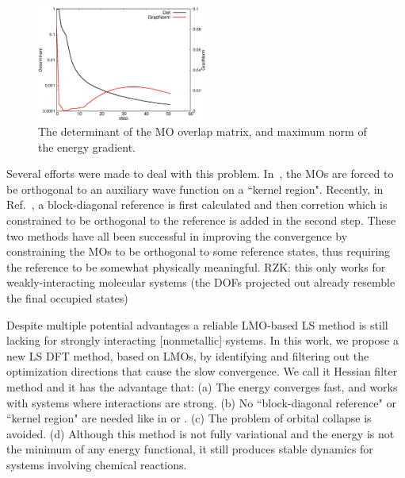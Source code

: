 \documentclass[aps,prl,twocolumn,reprint,amsmath,amssymb]{revtex4-1}
\begin{document}

\begin{figure}
\includegraphics[width=0.5\textwidth]{det}
\caption{The determinant of the MO overlap matrix, and maximum norm of the energy gradient. }
\label{fig:det}
\end{figure}

Several efforts were made to deal with this problem. In~\cite{tsuchida2007augmented,tsuchida2008ab}, the MOs are forced to be orthogonal to an auxiliary wave function on a ``kernel region". Recently, in Ref.~, a block-diagonal reference is first calculated and then corretion which is constrained to be orthogonal to the reference is added in the second step. These two methods have all been successful in improving the convergence by constraining the MOs to be orthogonal to some reference states, thus requiring the reference to be somewhat physically meaningful. RZK: this only works for weakly-interacting molecular systems (the DOFs projected out already resemble the final occupied states)

Despite multiple potential advantages a reliable LMO-based LS method is still lacking for strongly interacting [nonmetallic] systems. In this work, we propose a new LS DFT method, based on LMOs, by identifying and filtering out the optimization directions that cause the slow convergence. We call it Hessian filter method and it has the advantage that: (a) The energy converges fast, and works with systems where interactions are strong. (b) No ``block-diagonal reference" or ``kernel region" are needed like in \cite{tsuchida2007augmented} or \cite{khaliullin2013efficient}.
(c) The problem of orbital collapse is avoided. (d) Although this method is not fully variational and the energy is not the minimum of any energy functional, it still produces stable dynamics for systems involving chemical reactions. 
\end{document}
